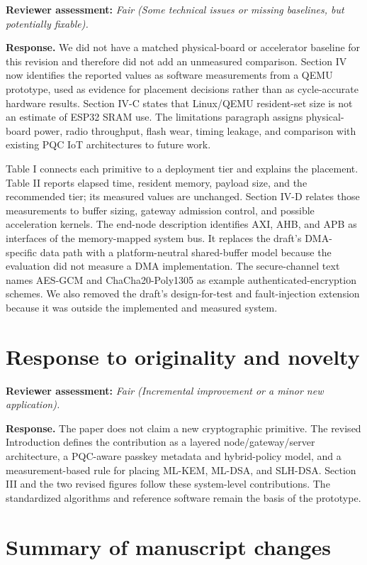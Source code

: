 \documentclass[10pt,letterpaper]{article}
\begin{document}
\textcolor{reviewblue}{\textbf{Reviewer assessment:}} \emph{Fair (Some technical issues or missing baselines, but potentially fixable).}

\textbf{Response.} We did not have a matched physical-board or accelerator baseline for this revision and therefore did not add an unmeasured comparison. Section IV now identifies the reported values as software measurements from a QEMU prototype, used as evidence for placement decisions rather than as cycle-accurate hardware results. Section IV-C states that Linux/QEMU resident-set size is not an estimate of ESP32 SRAM use. The limitations paragraph assigns physical-board power, radio throughput, flash wear, timing leakage, and comparison with existing PQC IoT architectures to future work.

Table I connects each primitive to a deployment tier and explains the placement. Table II reports elapsed time, resident memory, payload size, and the recommended tier; its measured values are unchanged. Section IV-D relates those measurements to buffer sizing, gateway admission control, and possible acceleration kernels. The end-node description identifies AXI, AHB, and APB as interfaces of the memory-mapped system bus. It replaces the draft's DMA-specific data path with a platform-neutral shared-buffer model because the evaluation did not measure a DMA implementation. The secure-channel text names AES-GCM and ChaCha20-Poly1305 as example authenticated-encryption schemes. We also removed the draft's design-for-test and fault-injection extension because it was outside the implemented and measured system.

\section*{Response to originality and novelty}

\textcolor{reviewblue}{\textbf{Reviewer assessment:}} \emph{Fair (Incremental improvement or a minor new application).}

\textbf{Response.} The paper does not claim a new cryptographic primitive. The revised Introduction defines the contribution as a layered node/gateway/server architecture, a PQC-aware passkey metadata and hybrid-policy model, and a measurement-based rule for placing ML-KEM, ML-DSA, and SLH-DSA. Section III and the two revised figures follow these system-level contributions. The standardized algorithms and reference software remain the basis of the prototype.

\section*{Summary of manuscript changes}
\end{document}
